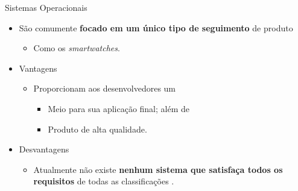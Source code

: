       \begin{frame}{\Wearable}{Sistemas Operacionais} \vspace{-1em}
            
         \begin{itemize} \setlength{\itemsep}{1.5em}
            \item São comumente \textbf{focado em um único tipo de seguimento} de produto
            \begin{itemize}
               \item Como os \textit{smartwatches}.
            \end{itemize}
            
            \item Vantagens
            \begin{itemize}
               \item Proporcionam aos desenvolvedores um
               \begin{itemize}
                  \item Meio para sua aplicação final; além de
                  \item Produto de alta qualidade.
               \end{itemize}
            \end{itemize}
            
            \item Desvantagens
            \begin{itemize}
               \item Atualmente não existe \textbf{nenhum sistema que satisfaça todos os requisitos} de todas as classificações \cite{Amorim2017}.
            \end{itemize}
         \end{itemize}
      \end{frame}
      
